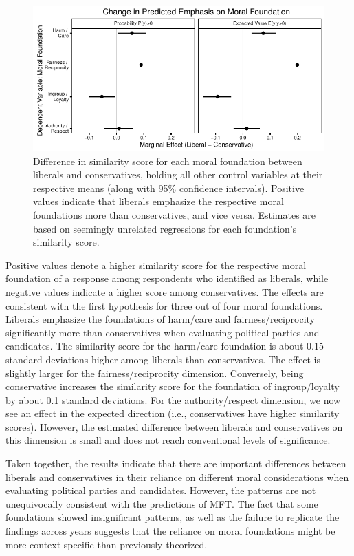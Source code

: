\documentclass[12pt]{article}
\begin{document}
\begin{figure}[h]\centering
\includegraphics{../calc/fig/tobit_ideol.pdf}
\caption{Difference in similarity score for each moral foundation between liberals and conservatives, holding all other control variables at their respective means (along with 95\% confidence intervals). Positive values indicate that liberals emphasize the respective moral foundations more than conservatives, and vice versa. Estimates are based on seemingly unrelated regressions for each foundation's similarity score. %
}\label{fig:tobit_ideol}
\end{figure}

Positive values denote a higher similarity score for the respective moral foundation of a response among respondents who identified as liberals, while negative values indicate a higher score among conservatives. The effects are consistent with the first hypothesis for three out of four moral foundations. Liberals emphasize the foundations of harm/care and fairness/reciprocity significantly more than conservatives when evaluating political parties and candidates. The similarity score for the harm/care foundation is about 0.15 standard deviations higher among liberals than conservatives. The effect is slightly larger for the fairness/reciprocity dimension. Conversely, being conservative increases the similarity score for the foundation of ingroup/loyalty by about 0.1 standard deviations. For the authority/respect dimension, we now see an effect in the expected direction (i.e., conservatives have higher similarity scores). However, the estimated difference between liberals and conservatives on this dimension is small and does not reach conventional levels of significance.

Taken together, the results indicate that there are important differences between liberals and conservatives in their reliance on different moral considerations when evaluating political parties and candidates. However, the patterns are not unequivocally consistent with the predictions of MFT. The fact that some foundations showed insignificant patterns, as well as the failure to replicate the findings across years suggests that the reliance on moral foundations might be more context-specific than previously theorized.
\end{document}
